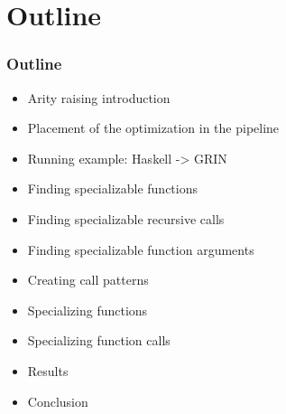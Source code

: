 \section{Outline}

\begin{frame}
\frametitle{Outline}

\begin{itemize}
\item Arity raising introduction
\item Placement of the optimization in the pipeline
\item Running example: Haskell -> GRIN
\item Finding specializable functions
\item Finding specializable recursive calls
\item Finding specializable function arguments
\item Creating call patterns
\item Specializing functions
\item Specializing function calls
\item Results
\item Conclusion
\end{itemize}

\end{frame}

